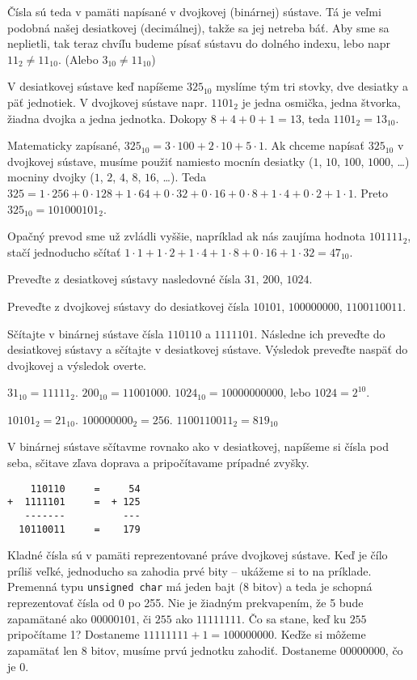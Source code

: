 \medskip
Čísla sú teda v pamäti napísané v dvojkovej (binárnej) sústave. Tá je veľmi
podobná našej desiatkovej (decimálnej), takže sa jej netreba báť.  Aby sme sa
neplietli, tak teraz chvíľu budeme písať sústavu do dolného indexu, lebo napr
$11_2 \neq 11_{10}$. (Alebo $3_{10} \neq 11_{10}$)

V desiatkovej sústave keď napíšeme $325_{10}$ myslíme tým tri stovky, dve
desiatky a päť jednotiek. V dvojkovej sústave napr. $1101_2$ je jedna osmička,
jedna štvorka, žiadna dvojka a jedna jednotka. Dokopy $8+4+0+1 = 13$, teda
$1101_2 = 13_{10}$. 

Matematicky zapísané, $325_{10} = 3\cdot 100 + 2\cdot 10 + 5\cdot 1$. Ak chceme
napísať $325_{10}$ v dvojkovej sústave, musíme použiť namiesto mocnín desiatky
($1$, $10$, $100$, $1000$, \dots) mocniny dvojky ($1$, $2$, $4$, $8$, $16$,
\dots). Teda $325 = 1\cdot 256 + 0\cdot 128 + 1\cdot 64 + 0\cdot 32 + 0\cdot 16
+ 0\cdot 8 + 1\cdot 4 + 0\cdot 2 + 1\cdot 1$.  Preto $325_{10} = 101000101_2$.

Opačný prevod sme už zvládli vyššie, napríklad ak nás zaujíma hodnota
$101111_2$, stačí jednoducho sčítať $1\cdot 1 + 1\cdot 2 + 1\cdot 4 + 1\cdot 8
+ 0\cdot 16 + 1\cdot 32 = 47_{10}$.

 Preveďte z desiatkovej sústavy nasledovné čísla $31$, $200$,
$1024$.

 Preveďte z dvojkovej sústavy do desiatkovej čísla $10101$,
$100000000$, $1100110011$.

 Sčítajte v binárnej sústave čísla $110110$ a $1111101$. Následne
ich preveďte do desiatkovej sústavy a sčítajte v desiatkovej sústave. Výsledok
preveďte naspäť do dvojkovej a výsledok overte.

 $31_{10} = 11111_2$. $200_{10} = 11001000$. $1024_{10} =
10000000000$, lebo $1024 = 2^{10}$.

 $10101_2 = 21_{10}$. $100000000_2 = 256$. $1100110011_2 =
819_{10}$

 V binárnej sústave sčítavme rovnako ako v desiatkovej, napíšeme si
čísla pod seba, sčitave zľava doprava a pripočítavame prípadné zvyšky.
\begin{verbatim}
    110110     =     54
+  1111101     =  + 125
   -------          ---
  10110011     =    179
\end{verbatim}

\medskip

Kladné čísla sú v pamäti reprezentované práve dvojkovej sústave. Keď je čílo
príliš veľké, jednoducho sa zahodia prvé bity -- ukážeme si to na príklade.
Premenná typu \verb!unsigned char! má jeden bajt (8 bitov) a teda je schopná
reprezentovať čísla od 0 po 255. Nie je žiadným prekvapením, že 5 bude
zapamätané ako $00000101$, či $255$ ako $11111111$. Čo sa stane, keď ku $255$
pripočítame 1? Dostaneme $11111111 + 1 = 100000000$.  Keďže si môžeme zapamätať
len 8 bitov, musíme prvú jednotku zahodiť. Dostaneme $00000000$, čo je 0.

